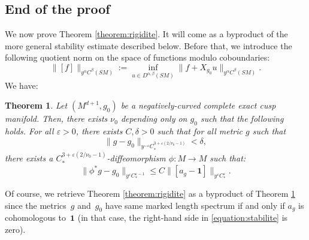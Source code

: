 \documentclass[JEP,XML,SOM,Unicode,NoFloatCountersInSection]{cedram}
\newcommand{\eps}{\varepsilon}
\theoremstyle{plain}
\newtheorem{theorem}{Theorem}[section]
\theoremstyle{definition}
\begin{document}
\subsection{End of the proof}

\label{section:proofs}

We now prove Theorem \ref{theorem:rigidite}. It will come as a byproduct of the more general stability estimate described below. Before that, we introduce the following quotient norm on the space of functions modulo coboundaries:
\[
\|[f]\|_{y^\alpha C^\beta(SM)} := \inf_{u \in D^{\alpha,\beta}(SM)} \|f + X_{g_0}u\|_{y^\alpha C^\beta(SM)}.
\]
We have:

\begin{theorem}
\label{theorem:stabilite}
Let $(M^{d+1},g_0)$ be a negatively-curved complete exact cusp manifold. Then, there exists $\nu_0$ depending only on $g_0$ such that the following holds. For all $\eps > 0$, there exists $C,\delta >0$ such that for all metric $g$ such that
\[
\|g-g_0\|_{y^{-\eps} C^{3+\eps(2/\nu_0-1)}_*} < \delta,
\]
there exists a $C^{3+\eps(2/\nu_0-1)}_*$-diffeomorphism $\phi : M \to M$ such that:
\begin{equation}
\label{equation:stabilite}
\|\phi^*g -g_0\|_{y^{\eps} C^{\eps-1}_*} \leq C \|[a_g-\mathbf{1}]\|_{y^{\eps}C^{ \eps}_*}.
\end{equation}
\end{theorem}

Of course, we retrieve Theorem \ref{theorem:rigidite} as a byproduct of Theorem \ref{theorem:stabilite} since the metrics~$g$ and~$g_0$ have same marked length spectrum if and only if $a_g$ is cohomologous to~$\mathbf{1}$ (in that case, the right-hand side in \eqref{equation:stabilite} is zero).
\end{document}
